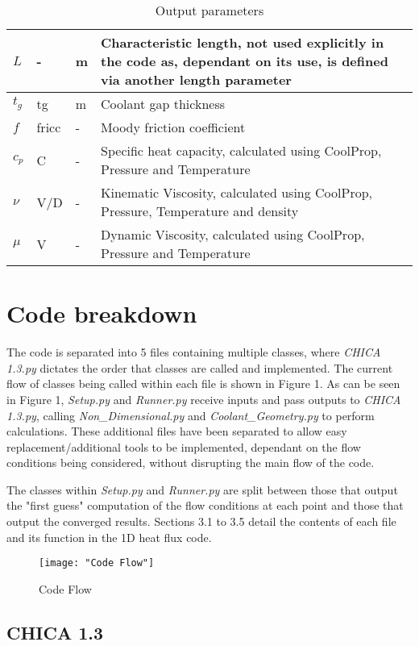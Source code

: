 \documentclass{article}
\begin{document}
\begin{table}[H]
\begin{tabular}{|p{2cm}|p{3cm}|p{1cm}|p{7cm}|}
		\hline
		$L$ & - & m & Characteristic length, not used explicitly in the code as, dependant on its use, is defined via another length parameter \\
		\hline
		$t_{g}$ & tg & m & Coolant gap thickness \\
		\hline
		$f$ & fricc & - & Moody friction coefficient \\
		\hline
		$c_{p}$ & C & - & Specific heat capacity, calculated using CoolProp, Pressure and Temperature \\
		\hline
		$\nu$ & V/D & - & Kinematic Viscosity, calculated using CoolProp, Pressure, Temperature and density \\
		\hline
		$\mu$ & V & - & Dynamic Viscosity, calculated using CoolProp, Pressure and Temperature \\
		\hline
	\end{tabular}
	\caption{Output parameters}
	\label{tab:caption}
\end{table}

\newpage
\section{Code breakdown}

 The code is separated into 5 files containing multiple classes, where \textit{CHICA 1.3.py} dictates the order that classes are called and implemented. The current flow of classes being called within each file is shown in Figure 1. As can be seen in Figure 1, \textit{Setup.py} and \textit{Runner.py} receive inputs and pass outputs to \textit{CHICA 1.3.py}, calling \textit{Non\_Dimensional.py} and \textit{Coolant\_Geometry.py} to perform calculations. These additional files have been separated to allow easy replacement/additional tools to be implemented, dependant on the flow conditions being considered, without disrupting the main flow of the code.
 
 The classes within \textit{Setup.py} and \textit{Runner.py} are split between those that output the "first guess" computation of the flow conditions at each point and those that output the converged results. Sections 3.1 to 3.5 detail the contents of each file and its function in the 1D heat flux code.

\begin{figure}[H]
	\centering
	\texttt{[image: "Code Flow"]}
	\caption{Code Flow}
	\label{fig:code-flow}
\end{figure}

\subsection{CHICA 1.3}
\end{document}
